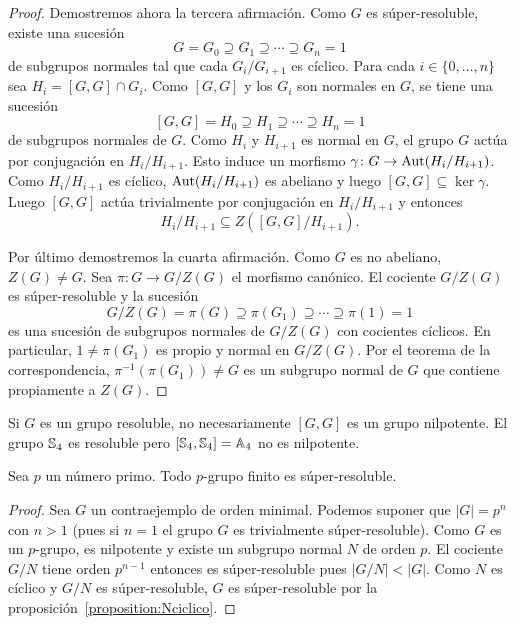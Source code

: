 \begin{proof}
	Demostremos ahora la tercera afirmación. Como $G$ es súper-resoluble, existe
	una sucesión
	\[
	G=G_0\supseteq G_1\supseteq\cdots\supseteq G_n=1
	\]
	de subgrupos normales tal que cada $G_i/G_{i+1}$ es cíclico. Para cada
	$i\in\{0,\dots,n\}$ sea $H_i=[G,G]\cap G_i$. Como $[G,G]$ y los $G_i$ son
	normales en $G$, se tiene una sucesión
	\[
	[G,G]=H_0\supseteq H_1\supseteq\cdots\supseteq H_n=1
	\]
	de subgrupos normales de $G$. Como $H_i$ y $H_{i+1}$ es normal en $G$, el
	grupo $G$ actúa por conjugación en $H_i/H_{i+1}$. Esto induce un morfismo
	$\gamma\colon G\to\operatorname{Aut}(H_i/H_{i+1})$. Como $H_i/H_{i+1}$ es cíclico, 
	$\operatorname{Aut}(H_i/H_{i+1})$ es abeliano y luego $[G,G]\subseteq\ker \gamma$. Luego
	$[G,G]$ actúa trivialmente por conjugación en $H_{i}/H_{i+1}$ y entonces
	\[
	H_i/H_{i+1}\subseteq Z([G,G]/H_{i+1}).
	\]

	Por último demostremos la cuarta afirmación. Como $G$ es no abeliano,
	$Z(G)\ne G$. Sea $\pi\colon G\to G/Z(G)$ el morfismo canónico.  El cociente
	$G/Z(G)$ es súper-resoluble y la sucesión
	\[
	G/Z(G)=\pi(G)\supseteq \pi(G_1)\supseteq\cdots\supseteq \pi(1)=1
	\]
	es una sucesión de subgrupos normales de $G/Z(G)$ con cocientes cíclicos.
	En particular, $1\ne \pi(G_1)$ es propio y normal en $G/Z(G)$.  Por el
	teorema de la correspondencia, $\pi^{-1}(\pi(G_1))\ne G$ es un subgrupo normal
	de $G$ que contiene propiamente a $Z(G)$. 
\end{proof}

\begin{example}
	Si $G$ es un grupo resoluble, no necesariamente $[G,G]$ es un grupo nilpotente. El grupo
	$\mathbb{S}_4$ es resoluble pero $[\mathbb{S}_4,\mathbb{S}_4]=\mathbb{A}_4$ no es nilpotente.
\end{example}

\begin{proposition}
	\label{proposition:psuper}
	Sea $p$ un número primo.  Todo $p$-grupo finito es súper-resoluble.
\end{proposition}

\begin{proof}
	Sea $G$ un contraejemplo de orden minimal. Podemos suponer que $|G|=p^n$
	con $n>1$ (pues si $n=1$ el grupo $G$ es trivialmente súper-resoluble).
	Como $G$ es un $p$-grupo, es nilpotente  y existe un subgrupo normal $N$ de
	orden $p$. El cociente $G/N$ tiene orden $p^{n-1}$ entonces es
	súper-resoluble pues $|G/N|<|G|$. Como $N$ es cíclico y $G/N$ es
	súper-resoluble, $G$ es súper-resoluble por la
	proposición~\ref{proposition:Nciclico}.
\end{proof}

